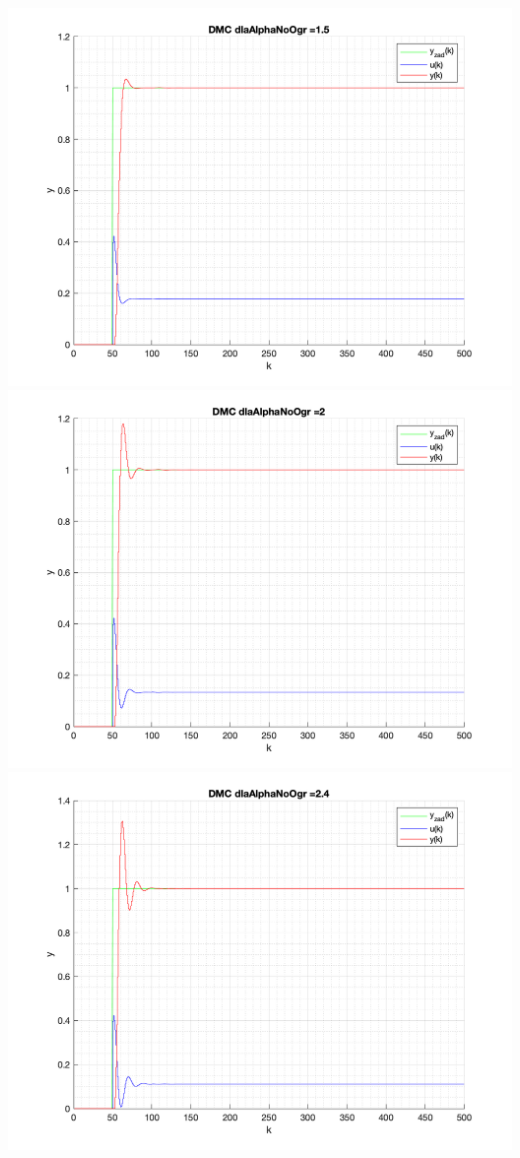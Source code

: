 \documentclass[a4paper, 11pt]{article}
\begin{document}
\begin{enumerate}
 \includegraphics[width=\linewidth]{./ModelsDodatkowe_AlphaNoOgr/P4_DMC_AlphaNoOgr_1_5_png.png} 
 \includegraphics[width=\linewidth]{./ModelsDodatkowe_AlphaNoOgr/P4_DMC_AlphaNoOgr_2_png.png} 
 \includegraphics[width=\linewidth]{./ModelsDodatkowe_AlphaNoOgr/P4_DMC_AlphaNoOgr_2_4_png.png} 
 

\end{enumerate}
\end{document}
